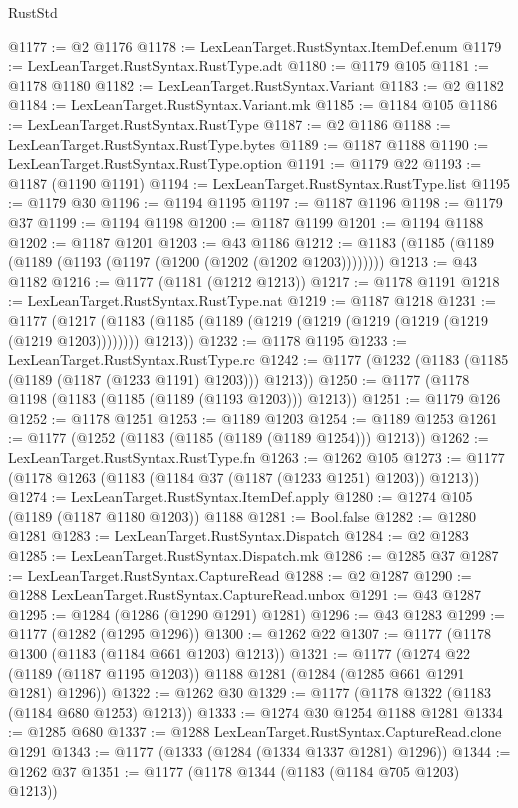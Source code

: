 \begin{lexlean}{RustStd}
\begin{coremodule}
@1177 := @2 @1176
@1178 := LexLeanTarget.RustSyntax.ItemDef.enum
@1179 := LexLeanTarget.RustSyntax.RustType.adt
@1180 := @1179 @105
@1181 := @1178 @1180
@1182 := LexLeanTarget.RustSyntax.Variant
@1183 := @2 @1182
@1184 := LexLeanTarget.RustSyntax.Variant.mk
@1185 := @1184 @105
@1186 := LexLeanTarget.RustSyntax.RustType
@1187 := @2 @1186
@1188 := LexLeanTarget.RustSyntax.RustType.bytes
@1189 := @1187 @1188
@1190 := LexLeanTarget.RustSyntax.RustType.option
@1191 := @1179 @22
@1193 := @1187 (@1190 @1191)
@1194 := LexLeanTarget.RustSyntax.RustType.list
@1195 := @1179 @30
@1196 := @1194 @1195
@1197 := @1187 @1196
@1198 := @1179 @37
@1199 := @1194 @1198
@1200 := @1187 @1199
@1201 := @1194 @1188
@1202 := @1187 @1201
@1203 := @43 @1186
@1212 := @1183 (@1185 (@1189 (@1189 (@1193 (@1197 (@1200 (@1202 (@1202 @1203))))))))
@1213 := @43 @1182
@1216 := @1177 (@1181 (@1212 @1213))
@1217 := @1178 @1191
@1218 := LexLeanTarget.RustSyntax.RustType.nat
@1219 := @1187 @1218
@1231 := @1177
    (@1217 (@1183 (@1185 (@1189 (@1219 (@1219 (@1219 (@1219 (@1219 (@1219 @1203)))))))) @1213))
@1232 := @1178 @1195
@1233 := LexLeanTarget.RustSyntax.RustType.rc
@1242 := @1177 (@1232 (@1183 (@1185 (@1189 (@1187 (@1233 @1191) @1203))) @1213))
@1250 := @1177 (@1178 @1198 (@1183 (@1185 (@1189 (@1193 @1203))) @1213))
@1251 := @1179 @126
@1252 := @1178 @1251
@1253 := @1189 @1203
@1254 := @1189 @1253
@1261 := @1177 (@1252 (@1183 (@1185 (@1189 (@1189 @1254))) @1213))
@1262 := LexLeanTarget.RustSyntax.RustType.fn
@1263 := @1262 @105
@1273 := @1177 (@1178 @1263 (@1183 (@1184 @37 (@1187 (@1233 @1251) @1203)) @1213))
@1274 := LexLeanTarget.RustSyntax.ItemDef.apply
@1280 := @1274 @105 (@1189 (@1187 @1180 @1203)) @1188
@1281 := Bool.false
@1282 := @1280 @1281
@1283 := LexLeanTarget.RustSyntax.Dispatch
@1284 := @2 @1283
@1285 := LexLeanTarget.RustSyntax.Dispatch.mk
@1286 := @1285 @37
@1287 := LexLeanTarget.RustSyntax.CaptureRead
@1288 := @2 @1287
@1290 := @1288 LexLeanTarget.RustSyntax.CaptureRead.unbox
@1291 := @43 @1287
@1295 := @1284 (@1286 (@1290 @1291) @1281)
@1296 := @43 @1283
@1299 := @1177 (@1282 (@1295 @1296))
@1300 := @1262 @22
@1307 := @1177 (@1178 @1300 (@1183 (@1184 @661 @1203) @1213))
@1321 := @1177
    (@1274 @22 (@1189 (@1187 @1195 @1203)) @1188 @1281 (@1284 (@1285 @661 @1291 @1281) @1296))
@1322 := @1262 @30
@1329 := @1177 (@1178 @1322 (@1183 (@1184 @680 @1253) @1213))
@1333 := @1274 @30 @1254 @1188 @1281
@1334 := @1285 @680
@1337 := @1288 LexLeanTarget.RustSyntax.CaptureRead.clone @1291
@1343 := @1177 (@1333 (@1284 (@1334 @1337 @1281) @1296))
@1344 := @1262 @37
@1351 := @1177 (@1178 @1344 (@1183 (@1184 @705 @1203) @1213))

\end{coremodule}
\end{lexlean}
